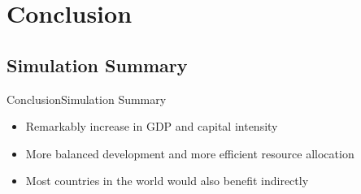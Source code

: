 \documentclass{beamer}
\begin{document}
\section{Conclusion}
\subsection{Simulation Summary}

\begin{frame}{Conclusion}{Simulation Summary}
\begin{itemize}
\item Remarkably increase in GDP and capital intensity 
\item More balanced development and more efficient resource allocation
\item Most countries in the world would also benefit indirectly
\end{itemize}
\end{frame}




\end{document}
